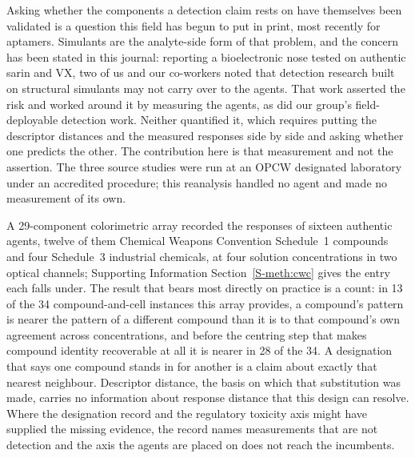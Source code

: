 \documentclass[journal=jacsat,manuscript=article,margin=1in]{achemso}
\begin{document}
Asking whether the components a detection claim rests on have themselves been
validated is a question this field has begun to put in print, most recently
for aptamers.\cite{chen2026aptamer} Simulants are the analyte-side form of that
problem, and the concern has been stated in this journal: reporting a
bioelectronic nose tested on authentic sarin and VX, two of us and our
co-workers noted that detection research built on structural simulants may not
carry over to the agents.\cite{yoo2025bioelectronic} That work asserted the
risk and worked around it by measuring the agents, as did our group's
field-deployable detection work.\cite{ondeviceref} Neither quantified it,
which requires putting the descriptor distances and the measured responses side
by side and asking whether one predicts the other. The contribution here is that measurement and
not the assertion. The three source studies were run at an OPCW designated
laboratory under an accredited procedure; this reanalysis handled no agent and
made no measurement of its own.

A 29-component colorimetric array recorded
the responses of sixteen authentic agents, twelve of them Chemical Weapons
Convention Schedule~1 compounds and four Schedule~3 industrial
chemicals,\cite{opcwschedules,opcwnovichok} at
four solution concentrations in two optical channels; Supporting Information
Section~\ref{S-meth:cwc} gives the entry each falls under. The result that bears
most directly on practice is a count: in 13 of the 34 compound-and-cell
instances this array provides, a compound's pattern is nearer the pattern of a
different compound than it is to that compound's own agreement across
concentrations, and before the centring step that makes compound identity
recoverable at all it is nearer in 28 of the 34. A designation that says one
compound stands in for another is a claim about exactly that nearest
neighbour. Descriptor distance, the basis on which that substitution
was made, carries no information about response distance that this design can
resolve. Where the designation record and the regulatory toxicity axis might
have supplied the missing evidence, the record names measurements that are not
detection and the axis the agents are placed on does not reach the
incumbents.
\end{document}

